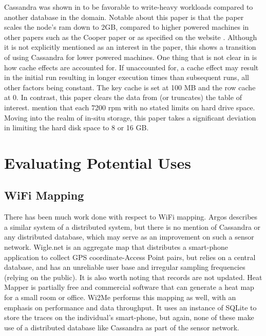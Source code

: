 Cassandra was shown in \cite{Abramova2013NoSQLCassandra} to be favorable to write-heavy workloads compared to another database in the domain.
Notable about this paper is that the paper scales the node's \gls{ram} down to 2GB, compared to higher powered machines in other papers such as the Cooper paper \cite{Cooper2010BenchmarkingYCSB} or as specified on the website \cite{CassandraHardwareWiki}.
Although it is not explicitly mentioned as an interest in the paper, this shows a transition of using Cassandra for lower powered machines.
One thing that is not clear in \cite{Abramova2014TestingCassandra} is how cache effects are accounted for.
If unaccounted for, a cache effect may result in the initial run resulting in longer execution times than subsequent runs, all other factors being constant. 
The key cache is set at 100 MB and the row cache at 0.
In contrast, this paper clears the data from (or truncates) the table of interest.
\cite{Abramova2014TestingCassandra} mention that each 7200 rpm with no stated limits on hard drive space.
Moving into the realm of in-situ storage, this paper takes a significant deviation in limiting the hard disk space to 8 or 16 GB.
\section{Evaluating Potential Uses}
\subsection{WiFi Mapping}
There has been much work done with respect to WiFi mapping.  Argos \cite{Rose2010MappingArgos} describes a similar system of a distributed system, but there is no mention of Cassandra or any distributed database, which may serve as an improvement on such a sensor network.  Wigle.net \cite{WiGLE:Mapping} is an aggregate map that distributes a smart-phone application to collect GPS coordinate-Access Point pairs, but relies on a central database, and has an unreliable user base and irregular sampling frequencies (relying on the public).  It is also worth noting that records are not updated.  Heat Mapper \cite{HeatMapperOffices} is partially free and commercial software that can generate a heat map for a small room or office.  Wi2Me \cite{Castignani2012Wi2Me:Networks} performs this mapping as well, with an emphasis on performance and data throughput.  It uses an instance of SQLite to store the traces on the individual's smart-phone, but again, none of these make use of a distributed database like Cassandra as part of the sensor network.

